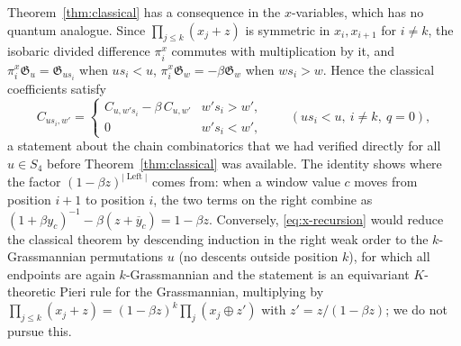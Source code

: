 \documentclass[11pt]{article}
\newcommand{\G}{\mathfrak{G}}
\newcommand{\Left}{\operatorname{Left}}
\begin{document}
Theorem~\ref{thm:classical} has a consequence in the $x$-variables,
which has no quantum analogue. Since $\prod_{j\leq k}(x_j+z)$ is
symmetric in $x_i,x_{i+1}$ for $i\neq k$, the isobaric divided
difference $\pi_i^x$ commutes with multiplication by it, and
$\pi^x_i\G_u=\G_{us_i}$ when $us_i<u$, $\pi^x_i\G_w=-\beta\G_w$ when
$ws_i>w$. Hence the classical coefficients satisfy
\begin{equation}\label{eq:x-recursion}
 C_{us_i,w'}
 =\begin{cases}
   C_{u,w's_i}-\beta\,C_{u,w'}& w's_i>w',\\
   0& w's_i<w',
  \end{cases}
 \qquad(us_i<u,\ i\neq k,\ q=0),
\end{equation}
a statement about the chain combinatorics that we had verified
directly for all $u\in S_4$ before Theorem~\ref{thm:classical} was
available. The identity shows where the factor $(1-\beta z)^{|\Left|}$
comes from: when a window value $c$ moves from position $i+1$ to
position $i$, the two terms on the right combine as
$(1+\beta y_c)^{-1}-\beta(z+\overline y_c)=1-\beta z$. Conversely,
\eqref{eq:x-recursion} would reduce the classical theorem by
descending induction in the right weak order to the $k$-Grassmannian
permutations $u$ (no descents outside position $k$), for which all
endpoints are again $k$-Grassmannian and the statement is an
equivariant $K$-theoretic Pieri rule for the Grassmannian,
multiplying by $\prod_{j\le k}(x_j+z)=(1-\beta z)^k\prod_j(x_j\oplus z')$
with $z'=z/(1-\beta z)$; we do not pursue this.
\end{document}

